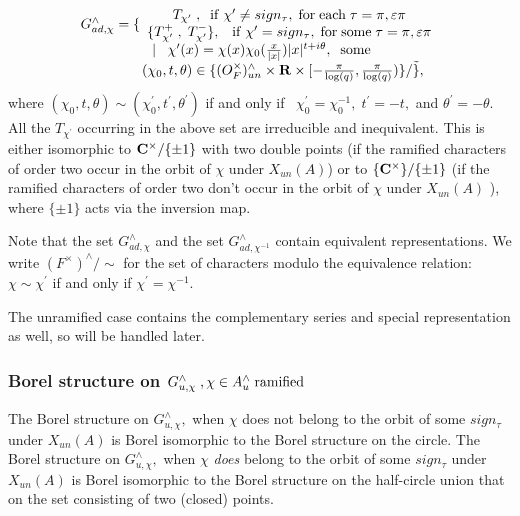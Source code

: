 \[
\begin{array}{c}
G_{ad,\chi }^{\wedge }=\{ 
\begin{array}{c}
T_{\chi ^{\prime }}\;,\; {\rm \;if\;}\chi ^{\prime }\neq sign_\tau ,\;{\rm %
for\;each}\;\tau =\pi ,\varepsilon \pi \\ 
\{T_{\chi ^{\prime }}^{+}\;,\;T_{\chi ^{\prime }}^{-}\},\;\;{\rm \;if\;}\chi
^{\prime }=sign_\tau ,\;{\rm for\;some}\;\tau =\pi ,\varepsilon \pi
\end{array}
\\ 
\;|\;\;\;\chi ^{\prime }(x)=\chi (x)\chi _0(\frac x{|x|})|x|^{t+i\theta
},\;\; {\rm some} \\ 
\;\;\;\;\;\;\;\;\;\;\;\;(\chi _0,t,\theta )\in \{(O_F^{\times
})_{un}^{\wedge }\times {\bf R}\times [-\frac \pi {\log (q)},\frac \pi {\log
(q)})\}/\tilde\},
\end{array}
\]
where $(\chi _0,t,\theta )\sim (\chi _0^{\prime },t^{\prime },\theta
^{\prime })$ if and only if \ $\chi _0^{\prime }=\chi _0^{-1},\;t^{\prime
}=-t,$ and $\theta ^{\prime }=-\theta .$ All the $T_{\chi ^{\prime }}$
occurring in the above set are irreducible and inequivalent. This is either
isomorphic to ${\bf C}^{\times }/\{\pm 1\}$ with two double points (if the
ramified characters of order two occur in the orbit of $\chi $ under $%
X_{un}(A)$) or to $\{{\bf C}^{\times }\}/\{\pm 1\}$ (if the ramified
characters of order two don't occur in the orbit of $\chi $ under $X_{un}(A)$%
), where $\{\pm 1\}$ acts via the inversion map.

Note that the set $G_{ad,\chi }^{\wedge }$ and the set $G_{ad,\chi
^{-1}}^{\wedge }$ contain equivalent representations. We write $(F^{\times
})^{\wedge }/\sim$ for the set of characters modulo the equivalence
relation: $\chi \sim \chi ^{\prime }$ if and only if $\chi ^{\prime }=\chi
^{-1}$.

The unramified case contains the complementary series and special
representation as well, so will be handled later.

\subsubsection{Borel structure on $G_{u,\chi }^{\wedge }\;,\chi \in
A_u^{\wedge }\;{\rm ramified}$}

The Borel structure on $G_{u,\chi }^{\wedge },$ when $\chi $ does not belong
to the orbit of some $sign_\tau $ under $X_{un}(A)$ is Borel isomorphic to
the Borel structure on the circle. The Borel structure on $G_{u,\chi
}^{\wedge },$ when $\chi $ {\em does} belong to the orbit of some $sign_\tau 
$ under $X_{un}(A)$ is Borel isomorphic to the Borel structure on the
half-circle union that on the set consisting of two (closed) points.

